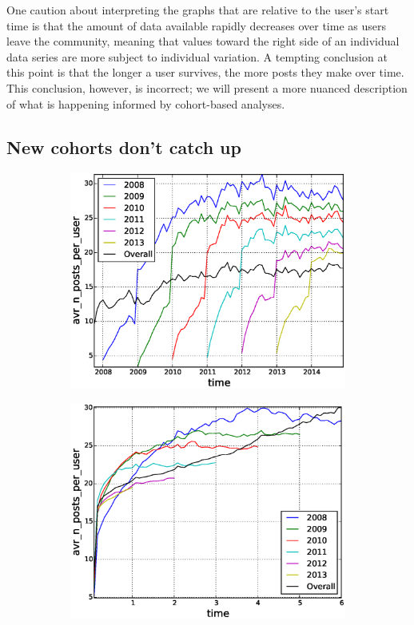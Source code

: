 One caution about interpreting the graphs that are relative to the user's start time is that the amount of data available rapidly decreases over time as users leave the community, meaning that values toward the right side of an individual data series are more subject to individual variation.  A tempting conclusion at this point is that the longer a user survives, the more posts they make over time.  This conclusion, however, is incorrect; we will present a more nuanced description of what is happening informed by cohort-based analyses.


\subsection{New cohorts don't catch up}

\begin{figure}[!tb]
\centering
\begin{subfigure}{.49\textwidth}\includegraphics[scale=0.4]{./images/avr_posts_per_user_over_time_cohorts.eps}\caption{}\end{subfigure}
\begin{subfigure}{.49\textwidth}\includegraphics[scale=0.4]{./images/avr_posts_per_user_cohorts.eps}\caption{}\end{subfigure}

\end{figure}

